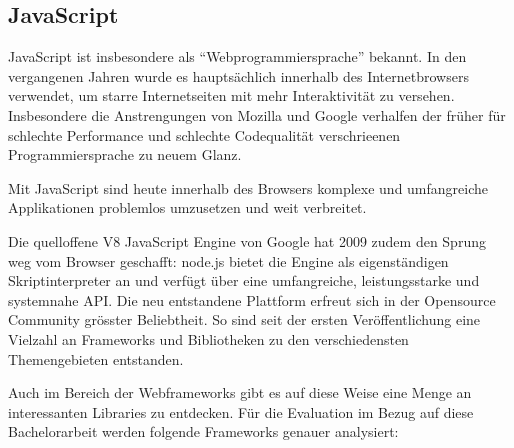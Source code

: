 \subsection{JavaScript}
\label{sec:technology-evaluation-javascript}

JavaScript ist insbesondere als ``Webprogrammiersprache'' bekannt. In den vergangenen Jahren wurde es hauptsächlich innerhalb des Internetbrowsers verwendet, um starre Internetseiten mit mehr Interaktivität zu versehen. Insbesondere die Anstrengungen von Mozilla \cite{SpiderMonkey} und Google \cite{V8JavaScript} verhalfen der früher für schlechte Performance und schlechte Codequalität verschrieenen Programmiersprache zu neuem Glanz.

Mit JavaScript sind heute innerhalb des Browsers komplexe und umfangreiche Applikationen problemlos umzusetzen und weit verbreitet.

Die quelloffene V8 JavaScript Engine \cite{V8JavaScript} von Google hat 2009 zudem den Sprung weg vom Browser geschafft: node.js \cite{nodejs} bietet die Engine als eigenständigen Skriptinterpreter an und verfügt über eine umfangreiche, leistungsstarke und systemnahe API. Die neu entstandene Plattform erfreut sich in der Opensource Community grösster Beliebtheit. So sind seit der ersten Veröffentlichung eine Vielzahl an Frameworks und Bibliotheken zu den verschiedensten Themengebieten entstanden.

Auch im Bereich der Webframeworks gibt es auf diese Weise eine Menge an interessanten Libraries zu entdecken. Für die Evaluation im Bezug auf diese Bachelorarbeit werden folgende Frameworks genauer analysiert:

